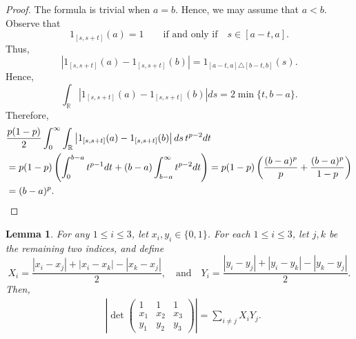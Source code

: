 \documentclass[11pt,a4paper]{amsart}
\theoremstyle{plain}
\newtheorem{lemma}[theorem]{Lemma}
\theoremstyle{definition}
\begin{document}
\begin{proof}
    The formula is trivial when $a= b$. Hence, we may assume that $a <b$. Observe that
    \[
        1_{[s,s+t]} (a) = 1 \qquad \text{if and only if} \quad s \in [a-t,a].
    \]
    Thus,
    \[
        \left|{1}_{[s, s+t]}(a)-{1}_{[s, s+t]}(b)\right|= 1_{[a-t, a] \triangle[b-t, b]}(s).
    \]
    Hence, 
    \[
        \int_{\mathbb{R}}\left|{1}_{[s, s+t]}(a)-{1}_{[s, s+t]}(b)\right| d s =
        2 \min \{t,b-a\}.
    \]
    Therefore,
    \begin{align}
        &\frac{p(1-p)}{2} \int_0^{\infty} \int_{\mathbb{R}}\left|{1}_{[s, s+t]}(a)-{1}_{[s, s+t]}(b)\right| d s \, t^{p-2} d t 
        \\
        &=
        p(1-p) \left(\int_0^{b-a}  t^{p-1} d t
        +
        (b-a)\int_{b-a}^{\infty}   t^{p-2} d t\right)
        =
        p(1-p) \left( \frac{(b-a)^p}{p}
        +
        \frac{(b-a)^{p}}{1-p}\right)
        \\
        &= (b-a)^p. \qedhere
    \end{align}
\end{proof}

    \begin{lemma} \label{lem:desired-ineq-12-01}
    For any $ 1 \leq i \leq 3 $, let $ x_i, y_i \in \{0,1\}$. 
    For each $ 1 \leq i \leq 3$, let $j,k$ be the remaining two indices, and define
    \[
        X_ i = \frac{|x_i - x_j| + |x_i - x_k| - |x_k - x_j|}{2}, \quad \text{and} \quad Y_ i = \frac{|y_i - y_j| + |y_i - y_k| - |y_k - y_j|}{2}.
    \]
    Then, 
    \begin{equation}
    \begin{split} 
        &\left|\operatorname{det}\left(\begin{array}{ccc}1 & 1 & 1 \\ x_1 & x_2 & x_3 \\ y_1 & y_2 & y_3\end{array}\right)\right| 
        =
        \sum_{i \neq j} X_i Y_j.
    \end{split} 
    \end{equation}
\end{lemma}
\end{document}
